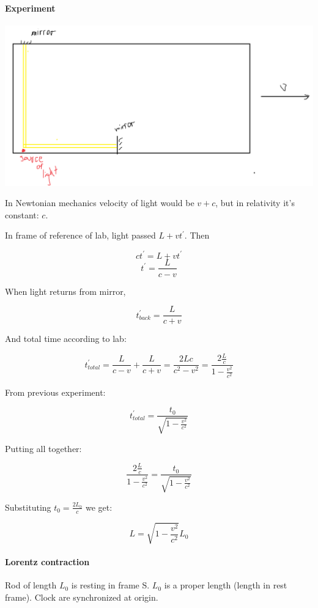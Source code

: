 \paragraph{Experiment}
\begin{center}
	\includegraphics[width=\linewidth]{./lect21/pic1.png}
\end{center}

In Newtonian mechanics velocity of light would be $v+c$, but in relativity it's constant: $c$.

In frame of reference of lab, light passed $L+vt^\prime$. Then

$$ct^\prime = L+vt^\prime$$
$$t^\prime = \frac{L}{c-v}$$

When light returns from mirror, 

$$t^\prime_{back} = \frac{L}{c+v}$$

And total time according to lab:

$$t^\prime_{total} = \frac{L}{c-v} + \frac{L}{c+v} = \frac{2Lc}{c^2-v^2}= \frac{2\frac{L}{c}}{1-\frac{v^2}{c^2}}$$

From previous experiment:

$$t^\prime_{total} = \frac{t_0}{\sqrt{1-\frac{v^2}{c^2}}}$$

Putting all together:

$$\frac{2\frac{L}{c}}{1-\frac{v^2}{c^2}} = \frac{t_0}{\sqrt{1-\frac{v^2}{c^2}}}$$

Substituting $t_0 = \frac{2L_0}{c}$ we get:

$$L = \sqrt{1-\frac{v^2}{c^2}}L_0$$

\paragraph{Lorentz contraction}
Rod of length $L_0$ is resting in frame S. $L_0$ is a proper length (length in rest frame). Clock are synchronized at origin.

